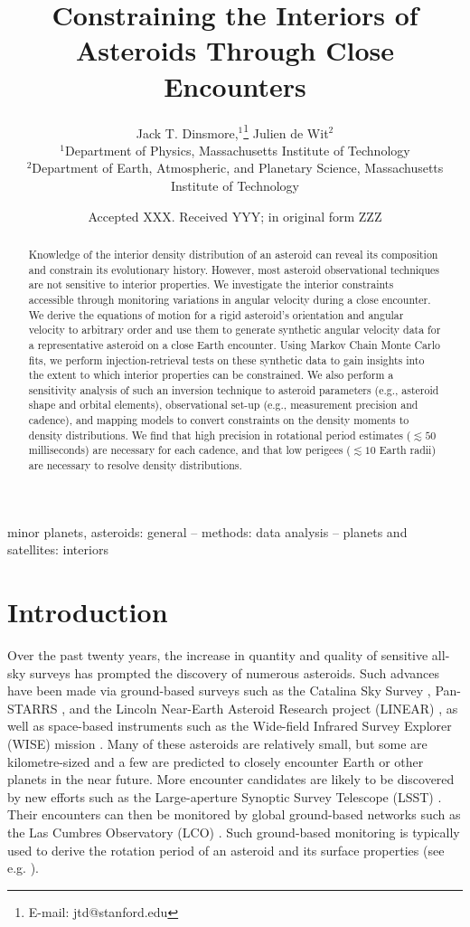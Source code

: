 \documentclass[fleqn,usenatbib]{mnras}
\title[Flyby Constraints on Asteroids Interiors]{Constraining the Interiors of Asteroids Through Close Encounters}
\author[Jack T. Dinsmore, Julien de Wit]{
Jack T. Dinsmore,$^{1}$\thanks{E-mail: jtd@stanford.edu}
Julien de Wit$^{2}$
\\
$^{1}$Department of Physics, Massachusetts Institute of Technology\\
$^{2}$Department of Earth, Atmospheric, and Planetary Science, Massachusetts Institute of Technology
}
\date{Accepted XXX. Received YYY; in original form ZZZ}
\begin{document}
\label{firstpage}
\pagerange{\pageref{firstpage}--\pageref{lastpage}}
\maketitle

\begin{abstract}
  Knowledge of the interior density distribution of an asteroid can reveal its composition and constrain its evolutionary history. However, most asteroid observational techniques are not sensitive to interior properties. We investigate the interior constraints accessible through monitoring variations in angular velocity during a close encounter. We derive the equations of motion for a rigid asteroid's orientation and angular velocity to arbitrary order and use them to generate synthetic angular velocity data for a representative asteroid on a close Earth encounter. Using Markov Chain Monte Carlo fits, we perform injection-retrieval tests on these synthetic data to gain insights into the extent to which interior properties can be constrained. We also perform a sensitivity analysis of such an inversion technique to asteroid parameters (e.g., asteroid shape and orbital elements), observational set-up (e.g., measurement precision and cadence), and mapping models to convert constraints on the density moments to density distributions. We find that high precision in rotational period estimates ($\lesssim 50$ milliseconds) are necessary for each cadence, and that low perigees ($\lesssim 10$ Earth radii) are necessary to resolve density distributions.
\end{abstract}

\begin{keywords}
  minor planets, asteroids: general -- methods: data analysis -- planets and satellites: interiors
\end{keywords}


\section{Introduction}

Over the past twenty years, the increase in quantity and quality of sensitive all-sky surveys has prompted the discovery of numerous asteroids. Such advances have been made via ground-based surveys such as the Catalina Sky Survey \citep{larson1998catalina}, Pan-STARRS \citep{kaiser2002pan}, and the Lincoln Near-Earth Asteroid Research project (LINEAR) \citep{stokes2000lincoln}, as well as space-based instruments such as the Wide-field Infrared Survey Explorer (WISE) mission \citep{wright2010wide}. Many of these asteroids are relatively small, but some are kilometre-sized and a few are predicted to closely encounter Earth or other planets in the near future. More encounter candidates are likely to be discovered by new efforts such as the Large-aperture Synoptic Survey Telescope (LSST) \citep{tyson2002large}. Their encounters can then be monitored by global ground-based networks such as the Las Cumbres Observatory (LCO) \citep{brown2013cumbres}. Such ground-based monitoring is typically used to derive the rotation period of an asteroid and its surface properties (see e.g. \cite{10.1093/mnras/stab1252}).
\end{document}
